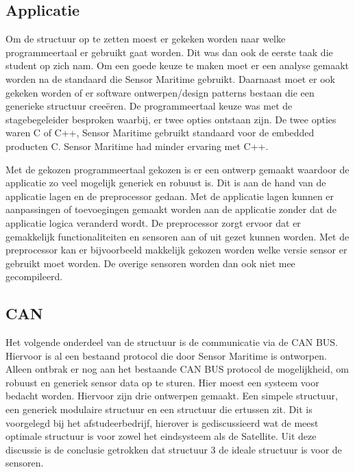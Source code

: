 \subsection{Applicatie}
Om de structuur op te zetten moest er gekeken worden naar welke programmeertaal er gebruikt gaat worden. Dit was dan ook de eerste taak die student op zich nam. Om een goede keuze te maken moet er een analyse gemaakt worden na de standaard die Sensor Maritime gebruikt. Daarnaast moet er ook gekeken worden of er software ontwerpen/design patterns bestaan die een generieke structuur creeëren. De programmeertaal keuze was met de stagebegeleider besproken waarbij, er twee opties ontstaan zijn. De twee opties waren C of C++, Sensor Maritime gebruikt standaard voor de embedded producten C. Sensor Maritime had minder ervaring met C++. \newline

\noindent Met de gekozen programmeertaal gekozen is er een ontwerp gemaakt waardoor de applicatie zo veel mogelijk generiek en robuust is. Dit is aan de hand van de applicatie lagen en de preprocessor gedaan. Met de applicatie lagen kunnen er aanpassingen of toevoegingen gemaakt worden aan de applicatie zonder dat de applicatie logica veranderd wordt. De preprocessor zorgt ervoor dat er gemakkelijk functionaliteiten en sensoren aan of uit gezet kunnen worden. Met de preprocessor kan er bijvoorbeeld makkelijk gekozen worden welke versie sensor er gebruikt moet worden. De overige sensoren worden dan ook niet mee gecompileerd.

\subsection{CAN}
Het volgende onderdeel van de structuur is de communicatie via de CAN BUS. Hiervoor is al een bestaand protocol die door Sensor Maritime is ontworpen. Alleen ontbrak er nog aan het bestaande CAN BUS protocol de mogelijkheid, om robuust en generiek sensor data op te sturen. Hier moest een systeem voor bedacht worden. Hiervoor zijn drie ontwerpen gemaakt. Een simpele structuur, een generiek modulaire structuur en een structuur die ertussen zit. Dit is voorgelegd bij het afstudeerbedrijf, hierover is gediscussieerd wat de meest optimale structuur is voor zowel het eindsysteem als de Satellite. Uit deze discussie is de conclusie getrokken dat structuur 3 de ideale structuur is voor de sensoren.

